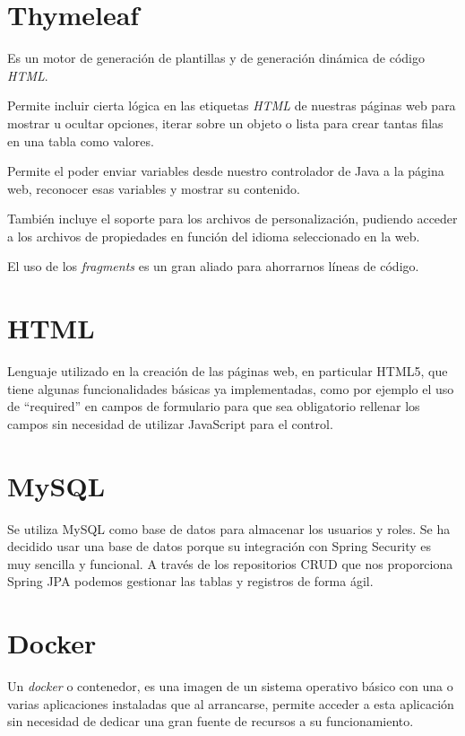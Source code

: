 \section{Thymeleaf}

Es un motor de generación de plantillas y de generación dinámica de código \textit{HTML}.

Permite incluir cierta lógica en las etiquetas \textit{HTML} de nuestras páginas web para mostrar u ocultar opciones, iterar sobre un objeto o lista para crear tantas filas en una tabla como valores.

Permite el poder enviar variables desde nuestro controlador de Java a la página web, reconocer esas variables y mostrar su contenido.

También incluye el soporte para los archivos de personalización, pudiendo acceder a los archivos de propiedades en función del idioma seleccionado en la web.

El uso de los \textit{fragments} es un gran aliado para ahorrarnos líneas de código.

\section{HTML}

Lenguaje utilizado en la creación de las páginas web, en particular HTML5, que tiene algunas funcionalidades básicas ya implementadas, como por ejemplo el uso de ``required'' en campos de formulario para que sea obligatorio rellenar los campos sin necesidad de utilizar JavaScript para el control.

\section{MySQL}

Se utiliza MySQL como base de datos para almacenar los usuarios y roles.
Se ha decidido usar una base de datos porque su integración con Spring Security es muy sencilla y funcional. 
A través de los repositorios CRUD que nos proporciona Spring JPA podemos gestionar las tablas y registros de forma ágil.

\section{Docker}

Un \textit{docker} o contenedor, es una imagen de un sistema operativo básico con una o varias aplicaciones instaladas que al arrancarse, permite acceder a esta aplicación sin necesidad de dedicar una gran fuente de recursos a su funcionamiento.

